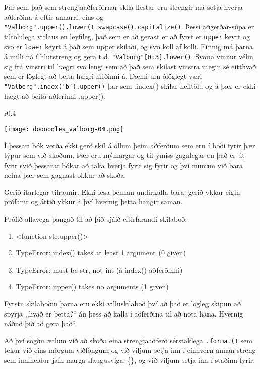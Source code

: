 Þar sem það sem strengjaaðferðirnar skila flestar eru strengir má setja hverja aðferðina á eftir annarri, eins og \texttt{"Valborg".upper().lower().swapcase().capitalize()}.
Þessi aðgerðar-súpa er tiltölulega vitlaus en leyfileg, það sem er að gerast er að fyrst er \texttt{upper} keyrt og svo er \texttt{lower} keyrt á það sem upper skilaði, og svo koll af kolli.
Einnig má þarna á milli ná í hlutstreng og gera t.d. \texttt{"Valborg"[0:3].lower()}.
Svona vinnur vélin sig frá vinstri til hægri svo lengi sem að það sem skilast vinstra megin sé eitthvað sem er löglegt að beita hægri hliðinni á.
Dæmi um ólöglegt væri \texttt{"Valborg".index('b').upper()} þar sem .index() skilar heiltölu og á þær er ekki hægt að beita aðferinni .upper().

\begin{wrapfigure}{r}{0.4\textwidth}
	\begin{center}
		\texttt{[image: doooodles\_valborg-04.png]}
	\end{center}
\end{wrapfigure}

Í þessari bók verða ekki gerð skil á öllum þeim aðferðum sem eru í boði fyrir þær týpur sem við skoðum.
Þær eru mýmargar og til ýmiss gagnlegar en það er út fyrir svið þessarar bókar að taka hverja fyrir sig fyrir og því munum við bara nefna þær sem gagnast okkur að skoða.

Gerið ítarlegar tilraunir.
Ekki lesa þennan undirkafla bara, gerið ykkar eigin prófanir og áttið ykkur á því hvernig þetta hangir saman.


Prófið allavega þangað til að þið sjáið eftirfarandi skilaboð:
\begin{enumerate}
	\item <function str.upper()> 
	\item TypeError: index() takes at least 1 argument (0 given)
	\item TypeError: must be str, not int (á index() aðferðinni)
	\item TypeError: upper() takes no arguments (1 given)
\end{enumerate}

Fyrstu skilaboðin þarna eru ekki villuskilaboð því að það er lögleg skipun að spyrja ,,hvað er þetta?“ án þess að kalla í aðferðina til að nota hana.
Hvernig náðuð þið að gera það? 


Að því sögðu ætlum við að skoða eina strengjaaðferð sérstaklega \texttt{.format()} sem tekur við eins mörgum viðföngum og við viljum setja inn í einhvern annan streng sem inniheldur jafn marga slaugusviga, \{\}, og við viljum setja inn í staðinn fyrir.


